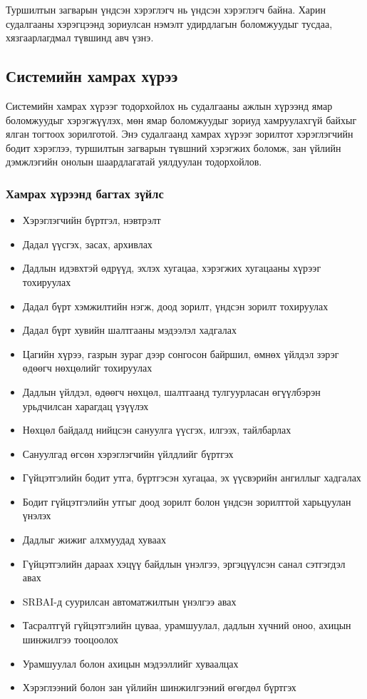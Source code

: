 Туршилтын загварын үндсэн хэрэглэгч нь үндсэн хэрэглэгч байна. Харин судалгааны хэрэгцээнд зориулсан нэмэлт удирдлагын боломжуудыг тусдаа, хязгаарлагдмал түвшинд авч үзнэ.

\subsection{Системийн хамрах хүрээ}

Системийн хамрах хүрээг тодорхойлох нь судалгааны ажлын хүрээнд ямар боломжуудыг хэрэгжүүлэх, мөн ямар боломжуудыг зориуд хамруулахгүй байхыг ялган тогтоох зорилготой. Энэ судалгаанд хамрах хүрээг зорилтот хэрэглэгчийн бодит хэрэглээ, туршилтын загварын түвшний хэрэгжих боломж, зан үйлийн дэмжлэгийн онолын шаардлагатай уялдуулан тодорхойлов.

\subsubsection*{Хамрах хүрээнд багтах зүйлс}

\begin{itemize}
    \item Хэрэглэгчийн бүртгэл, нэвтрэлт
    \item Дадал үүсгэх, засах, архивлах
    \item Дадлын идэвхтэй өдрүүд, эхлэх хугацаа, хэрэгжих хугацааны хүрээг тохируулах
    \item Дадал бүрт хэмжилтийн нэгж, доод зорилт, үндсэн зорилт тохируулах
    \item Дадал бүрт хувийн шалтгааны мэдээлэл хадгалах
    \item Цагийн хүрээ, газрын зураг дээр сонгосон байршил, өмнөх үйлдэл зэрэг өдөөгч нөхцөлийг тохируулах
    \item Дадлын үйлдэл, өдөөгч нөхцөл, шалтгаанд тулгуурласан өгүүлбэрэн урьдчилсан харагдац үзүүлэх
    \item Нөхцөл байдалд нийцсэн сануулга үүсгэх, илгээх, тайлбарлах
    \item Сануулгад өгсөн хэрэглэгчийн үйлдлийг бүртгэх
    \item Гүйцэтгэлийн бодит утга, бүртгэсэн хугацаа, эх үүсвэрийн ангиллыг хадгалах
    \item Бодит гүйцэтгэлийн утгыг доод зорилт болон үндсэн зорилттой харьцуулан үнэлэх
    \item Дадлыг жижиг алхмуудад хуваах
    \item Гүйцэтгэлийн дараах хэцүү байдлын үнэлгээ, эргэцүүлсэн санал сэтгэгдэл авах
    \item SRBAI-д суурилсан автоматжилтын үнэлгээ авах
    \item Тасралтгүй гүйцэтгэлийн цуваа, урамшуулал, дадлын хүчний оноо, ахицын шинжилгээ тооцоолох
    \item Урамшуулал болон ахицын мэдээллийг хуваалцах
    \item Хэрэглээний болон зан үйлийн шинжилгээний өгөгдөл бүртгэх
\end{itemize}

